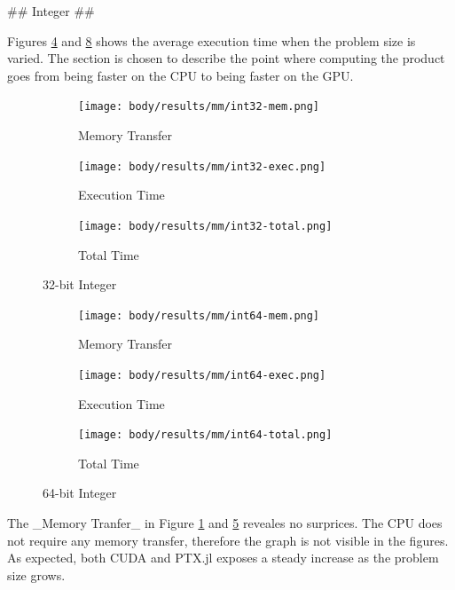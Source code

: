 \begin{markdown}
## Integer ##

Figures \ref{fig:res:mm:int32} and \ref{fig:res:mm:int64} shows the
average execution time when the problem size is varied. The section is
chosen to describe the point where computing the product goes from
being faster on the CPU to being faster on the GPU.

\begin{figure}[H]
  \centering
  \begin{subfigure}{.33\textwidth}
    \centering
    \texttt{[image: body/results/mm/int32-mem.png]}
    \caption{Memory Transfer}
    \label{fig:res:mm:int32:mem}
  \end{subfigure}%
  \begin{subfigure}{.33\textwidth}
    \centering
    \texttt{[image: body/results/mm/int32-exec.png]}
    \caption{Execution Time}
    \label{fig:res:mm:int32:exec}
  \end{subfigure}%
  \begin{subfigure}{.33\textwidth}
    \centering
    \texttt{[image: body/results/mm/int32-total.png]}
    \caption{Total Time}
    \label{fig:res:mm:int32:tot}
  \end{subfigure}
  \caption{32-bit Integer}
  \label{fig:res:mm:int32}
\end{figure}

\begin{figure}[H]
  \centering
  \begin{subfigure}{.33\textwidth}
    \centering
    \texttt{[image: body/results/mm/int64-mem.png]}
    \caption{Memory Transfer}
    \label{fig:res:mm:int64:mem}
  \end{subfigure}%
  \begin{subfigure}{.33\textwidth}
    \centering
    \texttt{[image: body/results/mm/int64-exec.png]}
    \caption{Execution Time}
    \label{fig:res:mm:int64:exec}
  \end{subfigure}%
  \begin{subfigure}{.33\textwidth}
    \centering
    \texttt{[image: body/results/mm/int64-total.png]}
    \caption{Total Time}
    \label{fig:res:mm:int64:tot}
  \end{subfigure}
  \caption{64-bit Integer}
  \label{fig:res:mm:int64}
\end{figure}

The _Memory Tranfer_ in Figure \ref{fig:res:mm:int32:mem} and
\ref{fig:res:mm:int64:mem} reveales no surprices. The CPU does not
require any memory transfer, therefore the graph is not visible in the
figures. As expected, both CUDA and PTX.jl exposes a steady increase
as the problem size grows.


\end{markdown}
